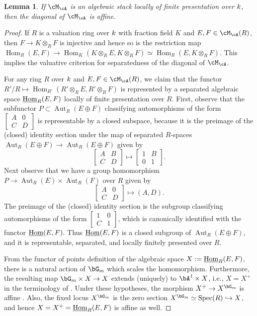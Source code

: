 \documentclass[a4paper]{amsart}
\numberwithin{equation}{section}
\theoremstyle{plain}
\newtheorem{lem}[thm]{Lemma}
\theoremstyle{definition}
\DeclareMathOperator{\Spec}{Spec}
\DeclareMathOperator{\Hom}{Hom}
\DeclareMathOperator{\Aut}{Aut}
\newcommand{\uHom}{\underline{{\rm Hom}}}
\begin{document}
\begin{lem} \label{L:abelian_diagonal}
If $\cM_\cA$ is an algebraic stack locally of finite presentation over $k$, then the diagonal of $\cM_\cA$ is affine.
\end{lem}
\begin{proof}
If $R$ is a valuation ring over $k$ with fraction field $K$ and $E,F \in \cM_\cA(R)$, then $F \to K \otimes_R F$ is injective and hence so is the restriction map $\Hom_R(E,F) \to \Hom_K(K \otimes_R E , K \otimes_R F) \simeq \Hom_R(E,K \otimes_R F)$. This implies the valuative criterion for separatedness of the diagonal of $\cM_\cA$.

For any ring $R$ over $k$ and $E,F \in \cM_\cA(R)$, we claim that the functor $R'/R \mapsto \Hom_{R'}(R'\otimes_R E,R'\otimes_R F)$ is represented by a separated algebraic space $\uHom_R(E,F)$ locally of finite presentation over $R$. First, observe that the subfunctor $P \subset \Aut_R(E\oplus F)$ classifying automorphisms of the form $\left[ \begin{smallmatrix} A & 0 \\ C & D \end{smallmatrix} \right]$ is representable by a closed subspace, because it is the preimage of the (closed) identity section under the map of separated $R$-spaces $\Aut_R(E\oplus F) \to \Aut_R(E\oplus F)$ given by
\[
\begin{bmatrix} A & B \\ C & D \end{bmatrix} \mapsto \begin{bmatrix} 1 & B \\ 0 & 1 \end{bmatrix}.
\]
Next observe that we have a group homomorphism $P \to \Aut_R(E) \times \Aut_R(F)$ over $R$ given by
\[
\begin{bmatrix} A & 0 \\ C & D \end{bmatrix} \mapsto (A,D).
\]
The preimage of the (closed) identity section is the subgroup classifying automorphisms of the form $\left[ \begin{smallmatrix} 1 & 0 \\ C & 1 \end{smallmatrix} \right]$, which is canonically identified with the functor $\uHom(E,F)$. Thus $\uHom(E,F)$ is a closed subgroup of $\Aut_R(E\oplus F)$, and it is representable, separated, and locally finitely presented over $R$.

From the functor of points definition of the algebraic space $X := \uHom_R(E,F)$, there is a natural action of $\bG_m$ which scales the homomorphism. Furthermore, the resulting map $\bG_m \times X \to X$ extends (uniquely) to $\bA^1 \times X$, i.e., $X = X^+$ in the terminology of . Under these hypotheses, the morphism $X^+ \to X^{\bG_m}$ is affine \cite{ahr2}. Also, the fixed locus $X^{\bG_m}$ is the zero section $X^{\bG_m} \simeq \Spec(R) \hookrightarrow X$, and hence $X = X^+ = \uHom_R(E,F)$ is affine as well.


\end{proof}
\end{document}
